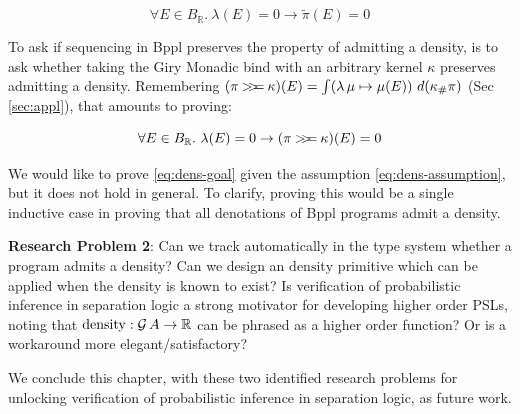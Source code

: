\begin{equation}\label{eq:dens-assumption}
\forall E \in B_{\mathbb{R}}.\ \lambda(E) = 0 \to \tilde{\pi}(E) = 0
\end{equation}

To ask if sequencing in Bppl preserves the property of admitting a density, is to ask whether taking the Giry Monadic bind with an arbitrary kernel $\kappa$ preserves admitting a density.
Remembering $(\pi \mathbin{>\!\!>\mkern-6.7mu=} \kappa)(E) = \int (\lambda\, \mu \mapsto \mu(E))\ d(\kappa_\#\pi)$ (Sec \ref{sec:appl}), that amounts to proving:

\begin{equation}\label{eq:dens-goal}
\forall E \in B_{\mathbb{R}}.\ \lambda(E) = 0 \to (\pi \mathbin{>\!\!>\mkern-6.7mu=} \kappa)(E) = 0
\end{equation}

We would like to prove \eqref{eq:dens-goal} given the assumption \eqref{eq:dens-assumption}, but it does not hold in general. To clarify, proving this would be a single inductive case in proving that all denotations of Bppl programs admit a density.

\textbf{Research Problem 2}: Can we track automatically in the type system whether a program admits a density? Can we design an $\mathrm{density}$ primitive which can be applied
when the density is known to exist? Is verification of probabilistic inference in separation logic a strong motivator for developing higher order PSLs, noting that
$\mathrm{density} : \mathcal{G}\, A \to \mathbb{R}$ can be phrased as a higher order function? Or is a workaround more elegant/satisfactory?

We conclude this chapter, with these two identified research problems for unlocking verification of probabilistic inference in separation logic, as future work.